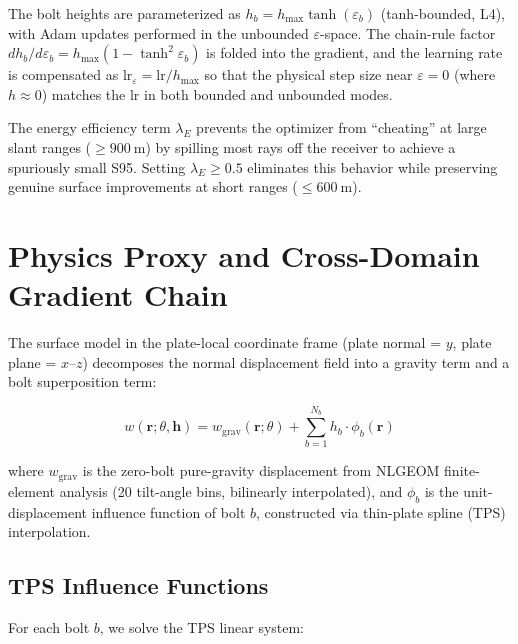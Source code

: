 \documentclass{CVM}
\begin{document}
The bolt heights are parameterized as $h_b = h_{\max} \tanh(\varepsilon_b)$
(tanh-bounded, L4), with Adam updates performed in the unbounded
$\varepsilon$-space. The chain-rule factor
$dh_b/d\varepsilon_b = h_{\max}(1-\tanh^2\varepsilon_b)$ is folded
into the gradient, and the learning rate is compensated as
$\text{lr}_\varepsilon = \text{lr} / h_{\max}$ so that the physical step size
near $\varepsilon=0$ (where $h\approx 0$) matches the lr in both bounded and
unbounded modes.

The energy efficiency term $\lambda_E$ prevents the optimizer from ``cheating''
at large slant ranges ($\ge\SI{900}{\meter}$) by spilling most rays off the
receiver to achieve a spuriously small S95. Setting $\lambda_E \ge 0.5$
eliminates this behavior while preserving genuine surface improvements
at short ranges ($\le\SI{600}{\meter}$).

\section{Physics Proxy and Cross-Domain Gradient Chain}
\label{sec:proxy}

The surface model in the plate-local coordinate frame (plate normal = $y$,
plate plane = $x$--$z$) decomposes the normal displacement field into a
gravity term and a bolt superposition term:

\begin{equation}
w(\mathbf{r}; \theta, \mathbf{h}) = w_{\text{grav}}(\mathbf{r}; \theta)
+ \sum_{b=1}^{N_b} h_b \cdot \phi_b(\mathbf{r})
\label{eq:surface}
\end{equation}

where $w_{\text{grav}}$ is the zero-bolt pure-gravity displacement from
NLGEOM finite-element analysis (20 tilt-angle bins, bilinearly interpolated),
and $\phi_b$ is the unit-displacement influence function of bolt $b$,
constructed via thin-plate spline (TPS) interpolation.

\subsection{TPS Influence Functions}

For each bolt $b$, we solve the TPS linear system:
\end{document}
